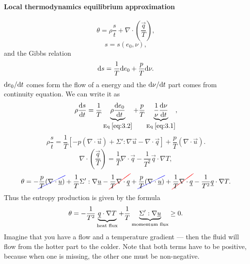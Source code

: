 \documentclass[../main.tex]{subfiles}
\begin{document}
    \paragraph{Local thermodynamics equilibrium approximation}
    \begin{displaymath}
      \theta = \rho \dfrac{s}{t} + \nabla \cdot \left( \frac{\vec q}{T} \right),
    \end{displaymath}
    \begin{displaymath}
      s = s(e_0, \nu),
    \end{displaymath}
    and the Gibbs relation
    \begin{displaymath}
      \mathrm{d} s = \frac{1}{T}\mathrm{d} e_0 + \frac{p}{T} \mathrm{d} \nu.
    \end{displaymath}
    $\mathrm{d} e_0/\mathrm{d} t$ comes form the flow of a energy and the $\mathrm{d} \nu / \mathrm{d} t$ part comes from continuity equation.
    We can write it as
    \begin{displaymath}
      \rho \frac{\mathrm{d} s}{\mathrm{d} t} = \frac{1}{T} \underbrace{\rho \frac{\mathrm{d} e_0}{\mathrm{d} t}}_{\textrm{Eq }\ref{eq:3.2}}
      + \frac{p}{T} \underbrace{\frac{1}{\nu} \frac{\mathrm{d} \nu }{\mathrm{d} t}}_{\textrm{Eq } \ref{eq:3.1}},
    \end{displaymath}
    \begin{displaymath}
      \rho \dfrac{s}{t} = \frac{1}{T} \left[ - p (\nabla \cdot \vec u) + \Sigma' : \nabla \vec u - \nabla \cdot \vec q \right]
      + \frac{p}{T} (\nabla \cdot \vec u).
    \end{displaymath}
    \begin{displaymath}
      \nabla \cdot \left( \frac{\vec q }{T} \right) = \frac{1}{T} \nabla \cdot \vec q - \frac{1}{T^2} \vec q \cdot \nabla T,
    \end{displaymath}
    \begin{displaymath}
      \theta =  -\Ccancel[blue]{\frac{p}{T} (\nabla \cdot \vec u)} + \frac{1}{T} \Sigma' : \nabla \vec u -\Ccancel[red]{ \frac{1}{T} \nabla \cdot \vec q}
      + \Ccancel[blue]{\frac{p}{T} (\nabla \cdot \vec u)} + \Ccancel[red]{\frac{1}{T} \nabla \cdot \vec q} - \frac{1}{T^2} \vec q \cdot \nabla T.
    \end{displaymath}
    Thus the entropy production is given by the formula
    \begin{displaymath}
      \theta = - \frac{1}{T^2} \underbrace{\underline{q} \cdot \nabla T}_{\textrm{heat flux}} + \frac{1}{T} \underbrace{\Sigma' : \nabla \underline{u}}_{\textrm{momentum flux}} \geq 0.
    \end{displaymath}
    Imagine that you have a flow and a temperature gradient --- then the fluid will flow from the hotter part to the colder.
    Note that both terms have to be positive, because when one is missing, the other one must be non-negative.
\end{document}
